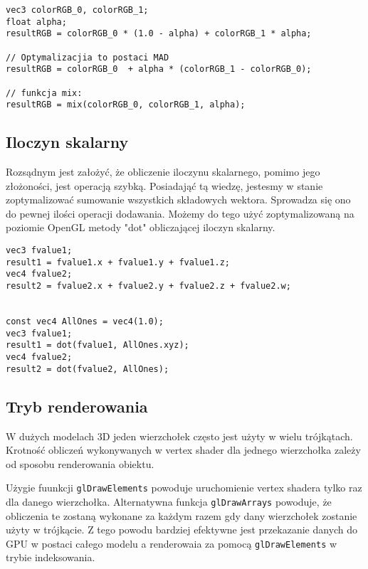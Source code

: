 \begin{lstlisting}[caption=Interpolacja liniowa]
vec3 colorRGB_0, colorRGB_1;
float alpha;
resultRGB = colorRGB_0 * (1.0 - alpha) + colorRGB_1 * alpha;
 
// Optymalizacjia to postaci MAD
resultRGB = colorRGB_0  + alpha * (colorRGB_1 - colorRGB_0);
 
// funkcja mix:
resultRGB = mix(colorRGB_0, colorRGB_1, alpha);
\end{lstlisting}

\subsection{Iloczyn skalarny}
\thispagestyle{empty}
\par\indent

Rozsądnym jest założyć, że obliczenie iloczynu skalarnego, pomimo jego złożoności, jest operacją szybką. Posiadająć tą wiedzę, jestesmy w stanie zoptymalizować sumowanie wszystkich składowych wektora. Sprowadza się ono do pewnej ilości operacji dodawania. Możemy do tego użyć zoptymalizowaną na poziomie OpenGL metody "dot" obliczającej iloczyn skalarny.

\begin{lstlisting}[caption=Sumowanie składowych wektora za pomocą iloczynu skalarnego]
vec3 fvalue1;
result1 = fvalue1.x + fvalue1.y + fvalue1.z;
vec4 fvalue2;
result2 = fvalue2.x + fvalue2.y + fvalue2.z + fvalue2.w;


const vec4 AllOnes = vec4(1.0);
vec3 fvalue1;
result1 = dot(fvalue1, AllOnes.xyz);
vec4 fvalue2;
result2 = dot(fvalue2, AllOnes);
\end{lstlisting}

\subsection{Tryb renderowania}
\thispagestyle{empty}
\par\indent

W dużych modelach 3D jeden wierzchołek często jest użyty w wielu trójkątach. Krotność obliczeń wykonywanych w vertex shader dla jednego wierzchołka zależy od sposobu renderowania obiektu.

Użygie fuunkcji \texttt{glDrawElements} powoduje uruchomienie vertex shadera tylko raz dla danego wierzchołka. Alternatywna funkcja \texttt{glDrawArrays} powoduje, że obliczenia te zostaną wykonane za każdym razem gdy dany wierzchołek zostanie użyty w trójkącie. Z tego powodu bardziej efektywne jest przekazanie danych do GPU w postaci całego modelu a renderowaia za pomocą \texttt{glDrawElements} w trybie indeksowania.

